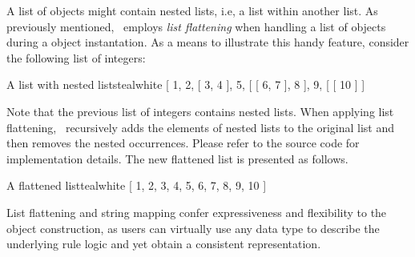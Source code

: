 A list of objects might contain nested lists, i.e, a list within another list. As previously mentioned, \arara\ employs \emph{list flattening} when handling a list of objects during a  object instantation. As a means to illustrate this handy feature, consider the following list of integers:

\begin{codebox}{A list with nested lists}{teal}{\icnote}{white}
[ 1, 2, [ 3, 4 ], 5, [ [ 6, 7 ], 8 ], 9, [ [ 10 ] ]
\end{codebox}

Note that the previous list of integers contains nested lists. When applying list flattening, \arara\ recursively adds the elements of nested lists to the original list and then removes the nested occurrences. Please refer to the source code for implementation details. The new flattened list is presented as follows.

\begin{codebox}{A flattened list}{teal}{\icnote}{white}
[ 1, 2, 3, 4, 5, 6, 7, 8, 9, 10 ]
\end{codebox}

List flattening and string mapping confer expressiveness and flexibility to the  object construction, as users can virtually use any data type to describe the underlying rule logic and yet obtain a consistent representation.

